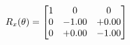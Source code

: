 \documentclass[preview]{standalone}
\begin{document}
\begin{align*}
\special{dvisvgm:raw <g id='unique000'>}R_{x}(\theta) = \begin{bmatrix}1 & 0 & 0 \\0 & -1.00 & +0.00 \\0 & +0.00 & -1.00\end{bmatrix}\special{dvisvgm:raw </g>}
\end{align*}
\end{document}
